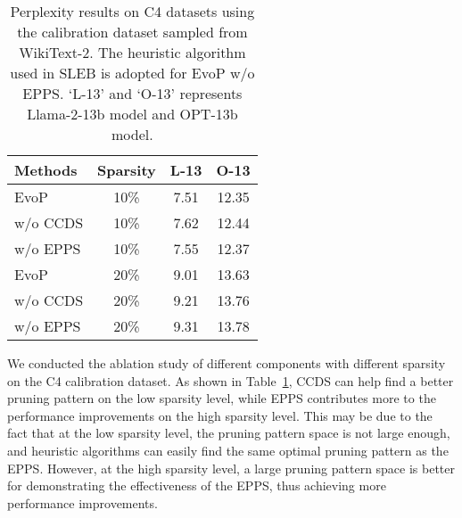 \begin{table}[t]
\centering
\begin{tabular}{lccc}
\toprule
Methods & Sparsity & L-13 & O-13 \\
\midrule
EvoP & 10\% & 7.51 & 12.35 \\
\quad w/o CCDS & 10\% & 7.62 & 12.44  \\
\quad w/o EPPS & 10\% & 7.55 & 12.37   \\
EvoP & 20\% & 9.01 & 13.63 \\
\quad w/o CCDS & 20\% & 9.21 & 13.76 \\
\quad w/o EPPS & 20\% & 9.31 & 13.78    \\
\bottomrule
\end{tabular}
\caption{Perplexity results on C4 datasets using the calibration dataset sampled from WikiText-2. The heuristic algorithm used in SLEB is adopted for EvoP w/o EPPS. `L-13' and `O-13' represents Llama-2-13b model and OPT-13b model.}
\label{tab-ablation}
\end{table}

We conducted the ablation study of different components with different sparsity on the C4 calibration dataset.
As shown in Table~\ref{tab-ablation}, CCDS can help find a better pruning pattern on the low sparsity level, while EPPS contributes more to the performance improvements on the high sparsity level.
This may be due to the fact that at the low sparsity level, the pruning pattern space is not large enough, and heuristic algorithms can easily find the same optimal pruning pattern as the EPPS.
However, at the high sparsity level, a large pruning pattern space is better for demonstrating the effectiveness of the EPPS, thus achieving more performance improvements.

